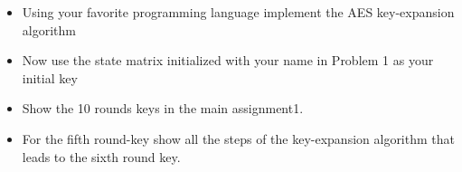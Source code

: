 \documentclass[10pt, a4paper]{article}
\begin{document}
\newpage
\begin{Problem}
	\begin{itemize}
		\item Using your favorite programming language implement the AES key-expansion algorithm
		\item Now use the state matrix initialized with your name in Problem 1 as your initial key
		\item Show the 10 rounds keys in the main assignment1.
		\item For the fifth round-key show all the steps of the key-expansion algorithm that leads to
		      the sixth round key.
	\end{itemize}
\end{Problem}
\end{document}
